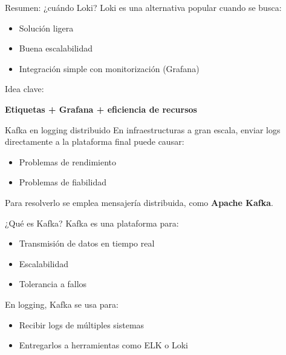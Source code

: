 \documentclass{beamer}
\begin{document}
\begin{frame}{Resumen: ¿cuándo Loki?}
Loki es una alternativa popular cuando se busca:
\begin{itemize}
    \item Solución ligera
    \item Buena escalabilidad
    \item Integración simple con monitorización (Grafana)
\end{itemize}

\vspace{0.3cm}
Idea clave:
\begin{center}
\textbf{Etiquetas + Grafana + eficiencia de recursos}
\end{center}
\end{frame}

\begin{frame}{Kafka en logging distribuido}
En infraestructuras a gran escala, enviar logs directamente a la plataforma final puede causar:
\begin{itemize}
    \item Problemas de rendimiento
    \item Problemas de fiabilidad
\end{itemize}

\vspace{0.3cm}
Para resolverlo se emplea mensajería distribuida, como \textbf{Apache Kafka}.
\end{frame}

\begin{frame}{¿Qué es Kafka?}
Kafka es una plataforma para:
\begin{itemize}
    \item Transmisión de datos en tiempo real
    \item Escalabilidad
    \item Tolerancia a fallos
\end{itemize}

\vspace{0.3cm}
En logging, Kafka se usa para:
\begin{itemize}
    \item Recibir logs de múltiples sistemas
    \item Entregarlos a herramientas como ELK o Loki
\end{itemize}
\end{frame}
\end{document}
